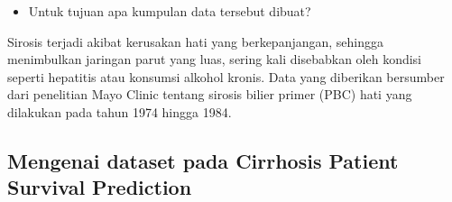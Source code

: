 \documentclass[
  letterpaper,
]{krantz}
\providecommand{\tightlist}{%
  \setlength{\itemsep}{0pt}\setlength{\parskip}{0pt}}\usepackage{longtable,booktabs,array}
\begin{document}
\begin{itemize}
\tightlist
\item
  Untuk tujuan apa kumpulan data tersebut dibuat?
\end{itemize}

Sirosis terjadi akibat kerusakan hati yang berkepanjangan, sehingga
menimbulkan jaringan parut yang luas, sering kali disebabkan oleh
kondisi seperti hepatitis atau konsumsi alkohol kronis. Data yang
diberikan bersumber dari penelitian Mayo Clinic tentang sirosis bilier
primer (PBC) hati yang dilakukan pada tahun 1974 hingga 1984.

\hypertarget{mengenai-dataset-pada-cirrhosis-patient-survival-prediction}{%
\subsection*{Mengenai dataset pada Cirrhosis Patient Survival
Prediction}\label{mengenai-dataset-pada-cirrhosis-patient-survival-prediction}}
\end{document}
